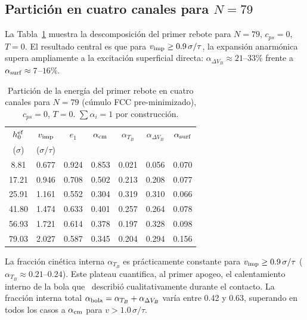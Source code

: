 \documentclass[12pt,a4paper]{article}
\begin{document}
\subsection{Partición en cuatro canales para \texorpdfstring{$N=79$}{N=79}}
\label{sec:4canales}

La Tabla~\ref{tab:particion4} muestra la descomposición del primer rebote para
$N=79$, $c_{ps}=0$, $T=0$. El resultado central es que para
$v_{\rm imp}\geq0.9\,\sigma/\tau$, la expansión anarmónica supera ampliamente
a la excitación superficial directa: $\alpha_{\Delta V_B}\approx21$--$33\%$
frente a $\alpha_{\rm surf}\approx7$--$16\%$.

\begin{table}[ht]
\centering
\small
\caption{Partición de la energía del primer rebote en cuatro canales para
$N=79$ (cúmulo FCC pre-minimizado), $c_{ps}=0$, $T=0$.
$\sum\alpha_i=1$ por construcción.}
\label{tab:particion4}
\begin{tabular}{ccccccc}
\toprule
$h_0^{\rm ef}$ & $v_{\rm imp}$ & $e_1$ &
$\alpha_{\rm cm}$ & $\alpha_{T_B}$ & $\alpha_{\Delta V_B}$ &
$\alpha_{\rm surf}$ \\
($\sigma$) & ($\sigma/\tau$) & & & & & \\
\midrule
 8.81 & 0.677 & 0.924 & 0.853 & 0.021 & 0.056 & 0.070 \\
17.21 & 0.946 & 0.708 & 0.502 & 0.213 & 0.208 & 0.077 \\
25.91 & 1.161 & 0.552 & 0.304 & 0.319 & 0.310 & 0.066 \\
41.80 & 1.474 & 0.633 & 0.401 & 0.257 & 0.264 & 0.078 \\
56.93 & 1.721 & 0.614 & 0.378 & 0.197 & 0.328 & 0.098 \\
79.03 & 2.027 & 0.587 & 0.345 & 0.204 & 0.294 & 0.156 \\
\bottomrule
\end{tabular}
\end{table}

La fracción cinética interna $\alpha_{T_B}$ es prácticamente constante para
$v_{\rm imp}\geq0.9\,\sigma/\tau$ ($\alpha_{T_B}\approx0.21$--$0.24$).
Este plateau cuantifica, al primer apogeo, el calentamiento interno de la
bola que~\cite{Gutierrez2012} describió cualitativamente durante el contacto.
La fracción interna total $\alpha_{\rm bola}=\alpha_{T_B}+\alpha_{\Delta V_B}$
varía entre 0.42 y 0.63, superando en todos los casos a $\alpha_{\rm cm}$
para $v>1.0\,\sigma/\tau$.
\end{document}
